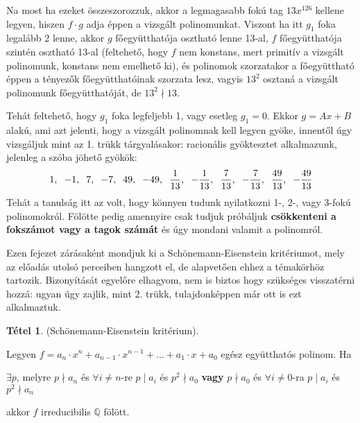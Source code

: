 \documentclass[12pt]{book}
\theoremstyle{plain} %
\theoremstyle{definition} %
\newtheorem{theo/}{Tétel}[section]
\newenvironment{theo}
  {\renewcommand{\qedsymbol}{$\clubsuit$}%
   \pushQED{\qed}\begin{theo/}}
  {\popQED\end{theo/}}
\theoremstyle{remark}
\renewcommand\qedsymbol{$\blacksquare$}
\numberwithin{equation}{section}  %
\begin{document}
\begin{enumerate}
{		Na most ha ezeket összeszorozzuk, akkor a legmagasabb fokú tag $13x^{126}$ kellene legyen, hiszen $f\cdot g$ adja éppen a vizsgált polinomunkat. Viszont ha itt $g_1$ foka legalább 2 lenne, akkor $g$ főegyütthatója osztható lenne 13-al, $f$ főegyütthatója szintén osztható 13-al (feltehető, hogy $f$ nem konstans, mert primitív a vizsgált polinomunk, konstans nem emelhető ki), és polinomok szorzatakor a főegyüttható éppen a tényezők főegyütthatóinak szorzata lesz, vagyis $13^2$ osztaná a vizsgált polinomunk főegyütthatóját, de $13^2 \nmid 13$.
		
		Tehát feltehető, hogy $g_1$ foka legfeljebb 1, vagy esetleg $g_1=0$. Ekkor $g=Ax+B$ alakú, ami azt jelenti, hogy a vizsgált polinomnak kell legyen gyöke, innentől úgy vizsgáljuk mint az 1. trükk tárgyalásakor: racionális gyöktesztet alkalmazunk, jelenleg a szóba jöhető gyökök: \[ 1,\hspace{2mm} -1,\hspace{2mm}7,\hspace{2mm}-7,\hspace{2mm}49,\hspace{2mm}-49,\hspace{2mm} \dfrac{1}{13},\hspace{2mm} -\dfrac{1}{13},\hspace{2mm} \dfrac{7}{13},\hspace{2mm} -\dfrac{7}{13},\hspace{2mm} \dfrac{49}{13},\hspace{2mm} -\dfrac{49}{13} \]
		Tehát a tanulság itt az volt, hogy könnyen tudunk nyilatkozni 1-, 2-, vagy 3-fokú polinomokról. Fölötte pedig amennyire csak tudjuk próbáljuk \textbf{csökkenteni a fokszámot vagy a tagok számát} és úgy mondani valamit a polinomról.		
		}
	\end{enumerate}
	
	Ezen fejezet zárásaként mondjuk ki a Schönemann-Eisenstein kritériumot, mely az előadás utolsó perceiben hangzott el, de alapvetően ehhez a témakörhöz tartozik. Bizonyítását egyelőre elhagyom, nem is biztos hogy szükséges visszatérni hozzá: ugyan úgy zajlik, mint 2. trükk, tulajdonképpen már ott is ezt alkalmaztuk.
	\begin{theo}
		(Schönemann-Eisenstein kritérium).
		
		Legyen $f=a_n\cdot x^n + a_{n-1}\cdot x^{n-1}+ \ldots + a_1\cdot x + a_0$ egész együtthatós polinom. Ha
		\begin{center}
			$\exists p$, melyre $p\nmid a_n$ és $\forall i\neq n$-re $p\mid a_i$ és $p^2 \nmid a_0$ \textbf{vagy} $p\nmid a_0$ és $\forall i\neq 0$-ra $p\mid a_i$ és $p^2 \nmid a_n$
		\end{center}
		akkor $f$ irreducibilis $\mathbb{Q}$ fölött.
	\end{theo}
	
\end{document}
